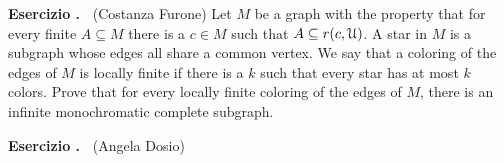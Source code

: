 \documentclass[10pt]{article}
\def\U{\EuScript U}
\newcounter{ex}
\newenvironment{exercise}{\bigskip\addtocounter{ex}{1}\textbf{Esercizio \theex.\ }}{}
\begin{document}
\begin{exercise} 
  (Costanza Furone)
  Let $M$ be a graph with the property that for every finite $A\subseteq M$ there is a $c\in M$ such that $A\subseteq r(c,\U)$. 
  A star in $M$ is a subgraph whose edges all share a common vertex. We say that a coloring of the edges of $M$ is locally finite if there is a $k$ such that every star has at most $k$ colors.
  Prove that for every locally finite coloring of the edges of $M$, there is an infinite monochromatic complete subgraph.
\end{exercise}

\begin{exercise}
  (Angela Dosio)
\end{exercise}
  
\end{document}
